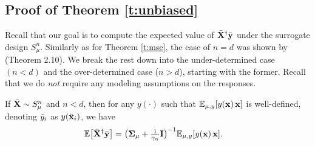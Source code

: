 \documentclass[11pt]{article}
\begin{document}
\subsection{Proof of Theorem \ref{t:unbiased}}
\label{s:unbiased-proof}
Recall that our goal is to compute the expected value of
${\bar{\mathbf X}}^\dagger\bar{\mathbf y}$ under the surrogate design $S_\mu^n$. Similarly as for Theorem
\ref{t:mse}, the case of $n=d$ was shown by
\cite{correcting-bias-journal} (Theorem 2.10). We break the rest down into the
under-determined case $(n<d)$ and the over-determined case ($n>d$),
starting with the former. Recall that we do \emph{not} require any
modeling assumptions on the responses.
\begin{lemma}\label{l:ridge-under}
If ${\bar{\mathbf X}}\sim S_\mu^n$ and $n<d$, then for any $y(\cdot)$
such that $\mathbb E_{\mu,y}[y(\mathbf x)\,\mathbf x]$ is well-defined,
denoting ${\bar y}_i$ as $y(\bar{\mathbf x}_i)$, we have
\begin{align*}
  \mathbb E\big[{\bar{\mathbf X}}^\dagger \bar{\mathbf y}\big]
  &=
    \big(\mathbf{\Sigma}_\mu+\tfrac1{\gamma_n}\mathbf I\big)^{-1}\mathbb E_{\mu,y}[y(\mathbf x)\,\mathbf x].
\end{align*}
\end{lemma}
\end{document}
